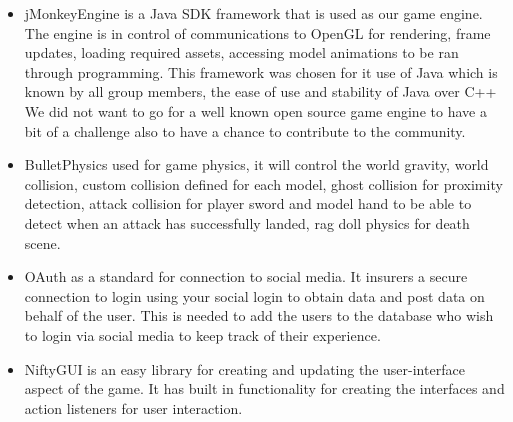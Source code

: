 \documentclass[letterpaper]{article}
\begin{document}
			\begin{itemize}
				\item jMonkeyEngine is a Java SDK framework that is used as our game engine. The engine is in control of communications to OpenGL for rendering, frame updates, loading required assets, accessing model animations to be ran through programming. This framework was chosen for it use of Java which is known by all group members, the ease of use and stability of Java over C++ We did not want to go for a well known open source game engine to have a bit of a challenge also to have a chance to contribute to the community.
				\item BulletPhysics used for game physics, it will control the world gravity, world collision, custom collision defined for each model, ghost collision for proximity detection, attack collision for player sword and model hand to be able to detect when an attack has successfully landed, rag doll physics for death scene.
				\item OAuth as a standard for connection to social media. It insurers a secure connection to login using your social login to obtain data and post data on behalf of the user. This is needed to add the users to the database who wish to login via social media to keep track of their experience.
				\item NiftyGUI is an easy library for creating and updating the user-interface aspect of the game. It has built in functionality for creating the interfaces and action listeners for user interaction.
			\end{itemize}
			
		\vspace{0.2in}
		\section*{\colorbox{blue}{}}
		\vspace{0.1in}
			
\end{document}
